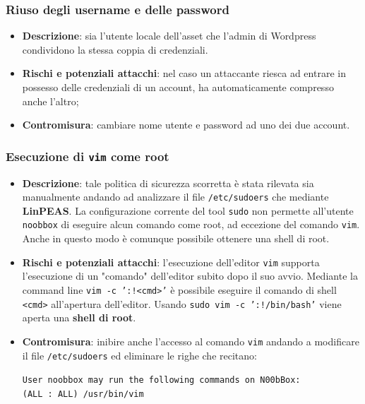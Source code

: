 \documentclass[a4paper, 12pt, oneside]{article}
\begin{document}
\subsubsection{Riuso degli username e delle password}
\begin{itemize}
    \item \textbf{Descrizione}: sia l'utente locale dell'asset che l'admin di Wordpress condividono la stessa coppia di credenziali.
    \item \textbf{Rischi e potenziali attacchi}: nel caso un attaccante riesca ad entrare in possesso delle credenziali di un account, ha automaticamente compresso anche l'altro;
    \item \textbf{Contromisura}: cambiare nome utente e password ad uno dei due account.
\end{itemize}

\subsubsection{Esecuzione di \texttt{vim} come root}
\begin{itemize}
    \item \textbf{Descrizione}: tale politica di sicurezza scorretta è stata rilevata sia manualmente andando ad analizzare il file \texttt{/etc/sudoers} che mediante \textbf{LinPEAS}. La configurazione corrente del tool \texttt{sudo} non permette all'utente \texttt{noobbox} di eseguire alcun comando come root, ad eccezione del comando \texttt{vim}. Anche in questo modo è comunque possibile ottenere una shell di root.
    \item \textbf{Rischi e potenziali attacchi}: l'esecuzione dell'editor \texttt{vim} supporta l'esecuzione di un "comando" dell'editor subito dopo il suo avvio. Mediante la command line \texttt{vim -c ':!<cmd>'} è possibile eseguire il comando di shell \texttt{<cmd>} all'apertura dell'editor. Usando \texttt{sudo vim -c ':!/bin/bash'} viene aperta una \textbf{shell di root}.
    \item \textbf{Contromisura}: inibire anche l'accesso al comando \texttt{vim} andando a modificare il file \texttt{/etc/sudoers} ed eliminare le righe che recitano: \begin{center}
        \texttt{User noobbox may run the following commands on N00bBox:\\
    (ALL : ALL) /usr/bin/vim}
    \end{center}
\end{itemize}
\newpage
\printbibliography[title={Riferimenti bibliografici}]
\end{document}
